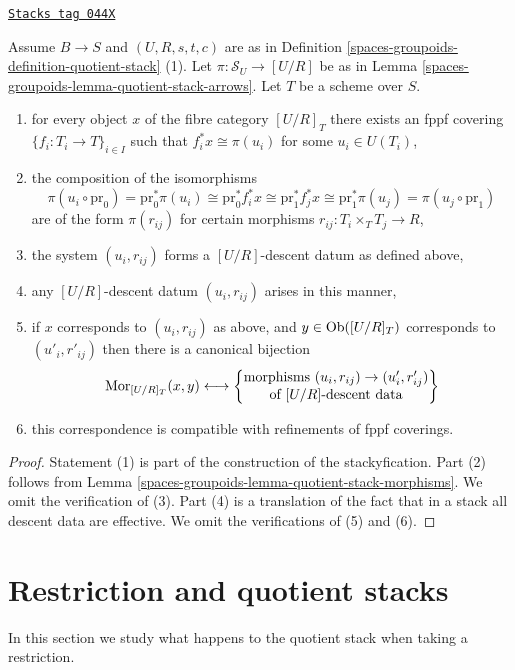 \begin{lemma}
\label{spaces-groupoids-lemma-quotient-stack-objects}
\href{https://stacks.math.columbia.edu/tag/044X}{\texttt{Stacks tag 044X}}

Assume $B \to S$ and $(U, R, s, t, c)$ are as in
Definition \ref{spaces-groupoids-definition-quotient-stack} (1).
Let $\pi : \mathcal{S}_U \to [U/R]$ be as in
Lemma \ref{spaces-groupoids-lemma-quotient-stack-arrows}.
Let $T$ be a scheme over $S$.
\begin{enumerate}
\item for every object $x$ of the fibre category $[U/R]_T$
there exists an fppf covering $\{f_i : T_i \to T\}_{i \in I}$ such that
$f_i^*x \cong \pi(u_i)$ for some $u_i \in U(T_i)$,
\item the composition of the isomorphisms
$$
\pi(u_i \circ \text{pr}_0)
=
\text{pr}_0^*\pi(u_i)
\cong
\text{pr}_0^*f_i^*x
\cong
\text{pr}_1^*f_j^*x
\cong
\text{pr}_1^*\pi(u_j)
=
\pi(u_j \circ \text{pr}_1)
$$
are of the form $\pi(r_{ij})$ for certain morphisms
$r_{ij} : T_i \times_T T_j \to R$,
\item the system $(u_i, r_{ij})$ forms
a $[U/R]$-descent datum as defined above,
\item any $[U/R]$-descent datum $(u_i, r_{ij})$ arises in this manner,
\item if $x$ corresponds to $(u_i, r_{ij})$ as above, and
$y \in \operatorname{Ob}([U/R]_T)$ corresponds to $(u'_i, r'_{ij})$
then there is a canonical bijection
$$
\operatorname{Mor}_{[U/R]_T}(x, y)
\longleftrightarrow
\left\{
\begin{matrix}
\text{morphisms }(u_i, r_{ij}) \to (u'_i, r'_{ij})\\
\text{of }[U/R]\text{-descent data}
\end{matrix}
\right\}
$$
\item this correspondence is compatible with refinements of fppf coverings.
\end{enumerate}
\end{lemma}

\begin{proof}
Statement (1) is part of the construction of the stackyfication.
Part (2) follows from
Lemma \ref{spaces-groupoids-lemma-quotient-stack-morphisms}.
We omit the verification of (3).
Part (4) is a translation of the fact that in a stack all descent data
are effective.
We omit the verifications of (5) and (6).
\end{proof}

\section{Restriction and quotient stacks}
\label{spaces-groupoids-section-quotient-stack-restrict}
In this section we study what happens to the quotient stack
when taking a restriction.

